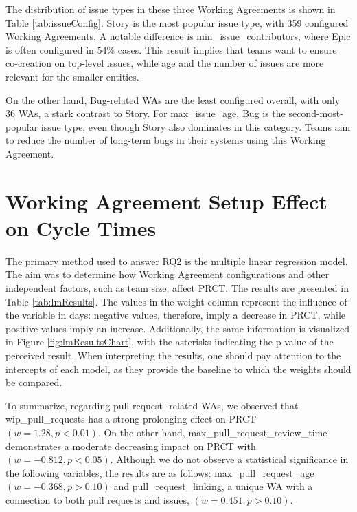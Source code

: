 

The distribution of issue types in these three Working Agreements is shown in Table \ref{tab:issueConfig}. Story is the most popular issue type, with 359 configured Working Agreements. A notable difference is min\_issue\_contributors, where Epic is often configured in $54\%$ cases. This result implies that teams want to ensure co-creation on top-level issues, while age and the number of issues are more relevant for the smaller entities. 

On the other hand, Bug-related WAs are the least configured overall, with only 36 WAs, a stark contrast to Story. For max\_issue\_age, Bug is the second-most-popular issue type, even though Story also dominates in this category. Teams aim to reduce the number of long-term bugs in their systems using this Working Agreement. 



\section{Working Agreement Setup Effect on Cycle Times}

The primary method used to answer RQ2 is the multiple linear regression model. The aim was to determine how Working Agreement configurations and other independent factors, such as team size, affect PRCT. The results are presented in Table \ref{tab:lmResults}. The values in the weight column represent the influence of the variable in days: negative values, therefore, imply a decrease in PRCT, while positive values imply an increase. Additionally, the same information is visualized in Figure \ref{fig:lmResultsChart}, with the asterisks indicating the p-value of the perceived result. When interpreting the results, one should pay attention to the intercepts of each model, as they provide the baseline to which the weights should be compared. 





To summarize, regarding pull request -related WAs, we observed that wip\_pull\_requests has a strong prolonging effect on PRCT $(w=1.28,p<0.01)$. On the other hand, max\_pull\_request\_review\_time demonstrates a moderate decreasing impact on PRCT with $(w=-0.812,p<0.05)$. Although we do not observe a statistical significance in the following variables, the results are as follows: max\_pull\_request\_age $(w=-0.368,p>0.10)$ and pull\_request\_linking, a unique WA with a connection to both pull requests and issues, $(w=0.451,p>0.10)$.

